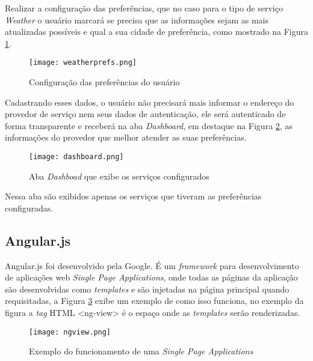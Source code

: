 Realizar a configuração das preferências, que no caso para o tipo de serviço \textit{Weather} o usuário marcará se precisa que as informações sejam as mais atualizadas possíveis e qual a sua cidade de preferência, como mostrado na Figura \ref{fig:weatherprefs}.

\begin{figure}[!htb]
  \centering
  \texttt{[image: weatherprefs.png]} %
  \caption[Configuração das preferências do usuário]{Configuração das preferências do usuário}
  \label{fig:weatherprefs}
\end{figure}

Cadastrando esses dados, o usuário não precisará mais informar o endereço do provedor de serviço nem seus dados de autenticação, ele será autenticado de forma transparente e receberá na aba \textit{Dashboard}, em destaque na Figura \ref{fig:dashboard}, as informações do provedor que melhor atender as suas preferências.

\begin{figure}[!htb]
  \centering
  \texttt{[image: dashboard.png]} %
  \caption[Aba \textit{Dashboad} que exibe os serviços configurados]{Aba \textit{Dashboad} que exibe os serviços configurados}
  \label{fig:dashboard}
\end{figure}

Nessa aba são exibidos apenas os serviços que tiveram as preferências configuradas.

\subsection{Angular.js}
Angular.js foi desenvolvido pela Google. É um \textit{framework} para desenvolvimento de aplicações web \textit{Single Page Applications}, onde todas as páginas da aplicação são desenvolvidas como \textit{templates} e são injetadas na página principal quando requisitadas, a Figura \ref{fig:ngview} exibe um exemplo de como isso funciona, no exemplo da figura a \textit{tag} HTML <ng-view> é o espaço onde as \textit{templates} serão renderizadas.

\begin{figure}[!htb]
  \centering
  \texttt{[image: ngview.png]} %
  \caption[Exemplo do funcionamento de uma \textit{Single Page Applications}]{Exemplo do funcionamento de uma \textit{Single Page Applications}}
  \label{fig:ngview}
\end{figure}

